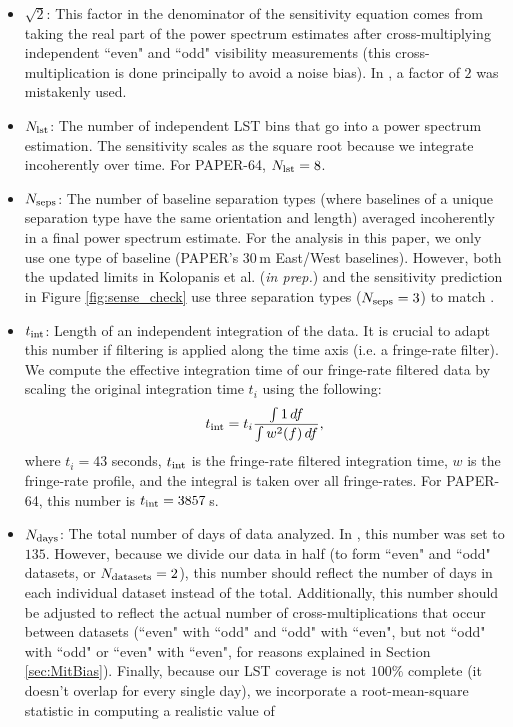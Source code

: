 \documentclass[preprint2,numberedappendix,tighten]{aastex6}  %
\begin{document}
\begin{itemize}
where $\nu$ are frequencies in GHz (\citealt{thompson_et_al2001}). We use a receiver temperature of $144$\,K, yielding $T_{\rm sys} = 431$\,K at $150$\,MHz. 
This is lower than the $T_{\rm sys}$ of $500$\,K used in  because of several small mis-calculation errors that were 
identified\footnote{For example, there was a missing a square root in going from a variance to a standard deviation.}.
\item $\sqrt{2}$: This factor in the denominator of the sensitivity equation comes from taking the real part of the power spectrum 
estimates after cross-multiplying independent ``even" and ``odd" visibility measurements (this cross-multiplication is done principally to avoid a noise bias). In , a factor of $2$ was mistakenly used.
\item $N_{\rm lst}$: The number of independent LST bins that go into a power spectrum estimation. The sensitivity scales as the square root 
because we integrate incoherently over time. For PAPER-64, $N_{\rm lst} = 8$.
\item $N_{\rm seps}$: The number of baseline separation types (where baselines of a unique separation type have the same orientation and length) averaged incoherently in a final power spectrum estimate. For the 
analysis in this paper, we only use one type of baseline (PAPER's 30\,m East/West baselines). However, both the updated limits in Kolopanis et al. (\textit{in prep.}) and the sensitivity prediction in Figure \ref{fig:sense_check} use three separation types ($N_{\rm seps}=3$) to match .
\item $t_{\rm int}$: Length of an independent integration of the data. It is crucial to adapt this number if filtering is applied along the time axis (i.e. a 
fringe-rate filter). We compute the effective integration time of our fringe-rate filtered data by scaling the original integration time $t_{i}$
using the following:
\begin{equation}
t_{\rm int} = t_{i} \frac{\int1 \, df}{\int w^{2}(f) \,df},
\end{equation}
where $t_{i}=43$ seconds, $t_{\rm int}$ is the fringe-rate filtered integration time, $w$ is the fringe-rate profile, and the integral is 
taken over all fringe-rates. For PAPER-64, this number is $t_{\rm int} = 3857$\,s. 
\item $N_{\rm days}$: The total number of days of data analyzed. In , this number was set to $135$. However, because we 
divide our data in half (to form ``even" and ``odd" datasets, or $N_{\rm datasets} = 2$), this number should reflect the number of days in each individual dataset instead of the total. Additionally, this number should be adjusted to reflect the actual number of cross-multiplications that occur between datasets (``even" with ``odd" and ``odd" with ``even", but not ``odd" with ``odd" or ``even" with ``even", for reasons explained in Section \ref{sec:MitBias}). Finally, because our LST coverage is not $100\%$ complete (it doesn't overlap for every single day), we incorporate a root-mean-square statistic in computing a realistic value of 

\end{itemize}
\end{document}
